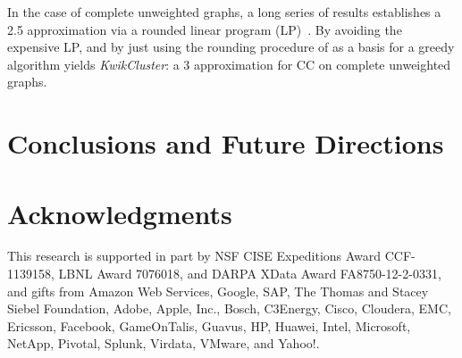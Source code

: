 \documentclass{article} %
\begin{document}
In the case of complete unweighted graphs, a long series of results establishes 
a 2.5 approximation via a rounded linear program (LP)~\cite{ailon2008aggregating}.
By avoiding the expensive LP, and by just using the rounding procedure of \cite{ailon2008aggregating} as a basis for a greedy algorithm yields {\it{KwikCluster}}:
a 3 approximation for CC on complete unweighted graphs.


\section{Conclusions and Future Directions}


\section{Acknowledgments}
This research is supported in part by NSF CISE Expeditions Award CCF-1139158, LBNL Award 7076018, and DARPA XData Award FA8750-12-2-0331, and  gifts from Amazon Web Services, Google, SAP,  The Thomas and Stacey Siebel Foundation, Adobe, Apple, Inc., Bosch, C3Energy, Cisco, Cloudera, EMC, Ericsson, Facebook, GameOnTalis, Guavus, HP, Huawei, Intel, Microsoft, NetApp, Pivotal, Splunk, Virdata, VMware, and Yahoo!.
\appendix
\end{document}
